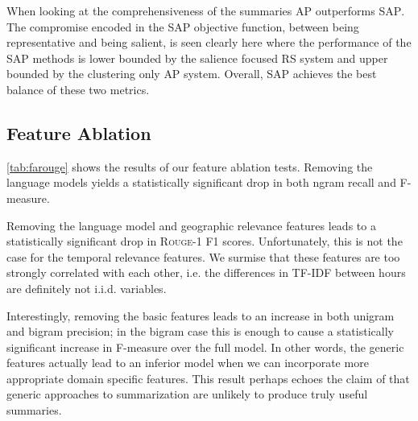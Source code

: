 When looking at the comprehensiveness of the summaries \textsc{AP} outperforms
\textsc{SAP}. The compromise encoded in the \textsc{SAP} 
objective function, between being representative and being salient, is seen 
clearly here where the performance of the \textsc{SAP} methods is 
lower bounded by the salience focused \textsc{RS} system and upper bounded by 
the clustering only \textsc{AP} system. Overall, \textsc{SAP} achieves
the best balance of these two metrics.


\subsection{Feature Ablation}



\autoref{tab:farouge} shows the results of our feature ablation tests. 
Removing the language models yields a statistically significant drop in both 
ngram recall and F-measure. 

Removing the language model and geographic relevance features leads to a
statistically significant drop in \textsc{Rouge-1} F1 scores. Unfortunately,
this is not the case for the temporal relevance features. We surmise that
these features are too strongly correlated with each other, 
i.e. the differences in TF-IDF between hours are definitely not i.i.d. 
variables. 

Interestingly, removing the basic features leads 
to an increase in both unigram and bigram precision; in the bigram case this 
is enough to cause a statistically significant increase in F-measure over the 
full model. In other words, the generic features actually lead to an inferior 
model when we can incorporate more appropriate domain specific features.
This result perhaps echoes the claim of \cite{ksj98} that generic approaches to 
summarization are unlikely to produce truly useful summaries.





